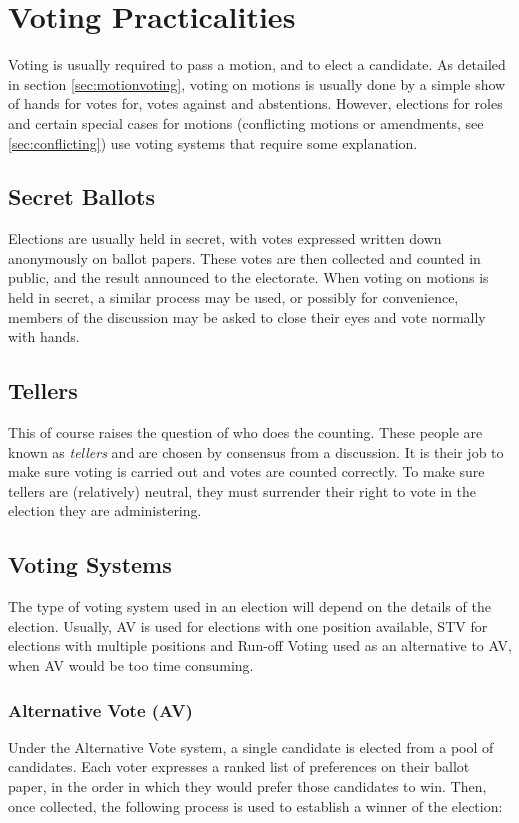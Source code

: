 \documentclass[a4paper, 11pt]{article} %
\begin{document}
\section{Voting Practicalities}
Voting is usually required to pass a motion, and to elect a candidate.  As detailed in section \ref{sec:motionvoting}, voting on motions is usually done by a simple show of hands for votes for, votes against and abstentions.  However, elections for roles and certain special cases for motions (conflicting motions or amendments, see \ref{sec:conflicting}) use voting systems that require some explanation.

\subsection{Secret Ballots}
Elections are usually held in secret, with votes expressed written down anonymously on ballot papers.  These votes are then collected and counted in public, and the result announced to the electorate.  When voting on motions is held in secret, a similar process may be used, or possibly for convenience, members of the discussion may be asked to close their eyes and vote normally with hands.

\subsection{Tellers}
This of course raises the question of who does the counting.  These people are known as \emph{tellers} and are chosen by consensus from a discussion.  It is their job to make sure voting is carried out and votes are counted correctly.  To make sure tellers are (relatively) neutral, they must surrender their right to vote in the election they are administering.

\subsection{Voting Systems}
The type of voting system used in an election will depend on the details of the election.  Usually, AV is used for elections with one position available, STV for elections with multiple positions and Run-off Voting used as an alternative to AV, when AV would be too time consuming.

\subsubsection{Alternative Vote (AV)}
\label{sec:av}
Under the Alternative Vote system, a single candidate is elected from a pool of candidates.  Each voter expresses a ranked list of preferences on their ballot paper, in the order in which they would prefer those candidates to win.  Then, once collected, the following process is used to establish a winner of the election:
\end{document}
